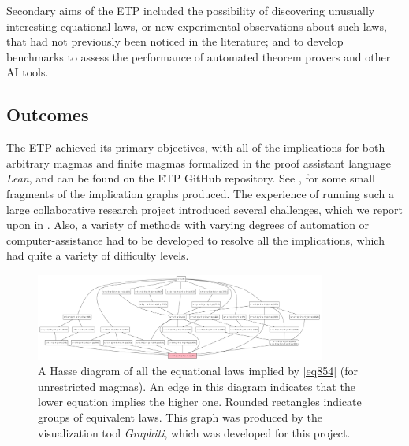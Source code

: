 Secondary aims of the ETP included the possibility of discovering unusually interesting equational laws, or new experimental observations about such laws, that had not previously been noticed in the literature; and to develop benchmarks to assess the performance of automated theorem provers and other AI tools.

\subsection{Outcomes}


The ETP achieved its primary objectives, with all of the implications for both arbitrary magmas and finite magmas formalized in the proof assistant language \emph{Lean}, and can be found on the ETP GitHub repository.  See ,  for some small fragments of the implication graphs produced. The experience of running such a large collaborative research project introduced several challenges, which we report upon in . Also, a variety of methods with varying degrees of automation or computer-assistance had to be developed to resolve all the implications, which had quite a variety of difficulty levels.

\begin{figure}
\centering
\includegraphics[width=0.85\textwidth]{854.png}
\caption{A Hasse diagram of all the equational laws implied by \eqref{eq854} (for unrestricted magmas).  An edge in this diagram indicates that the lower equation implies the higher one. Rounded rectangles indicate groups of equivalent laws.  This graph was produced by the visualization tool \emph{Graphiti}, which was developed for this project.}
\label{fig:854}
\end{figure}

